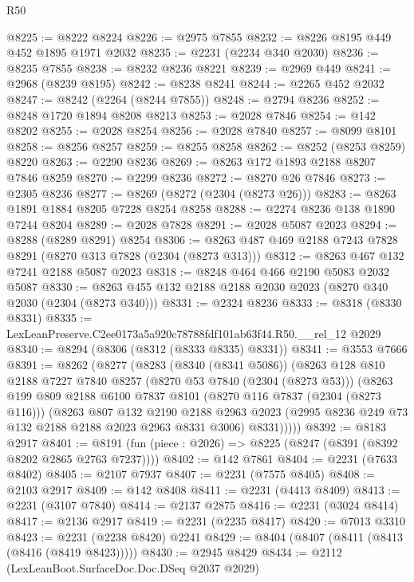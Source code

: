 \begin{lexlean}{R50}
\begin{coremodule}
@8225 := @8222 @8224
@8226 := @2975 @7855
@8232 := @8226 @8195 @449 @452 @1895 @1971 @2032
@8235 := @2231 (@2234 @340 @2030)
@8236 := @8235 @7855
@8238 := @8232 @8236 @8221
@8239 := @2969 @449
@8241 := @2968 (@8239 @8195)
@8242 := @8238 @8241
@8244 := @2265 @452 @2032
@8247 := @8242 (@2264 (@8244 @7855))
@8248 := @2794 @8236
@8252 := @8248 @1720 @1894 @8208 @8213
@8253 := @2028 @7846
@8254 := @142 @8202
@8255 := @2028 @8254
@8256 := @2028 @7840
@8257 := @8099 @8101
@8258 := @8256 @8257
@8259 := @8255 @8258
@8262 := @8252 (@8253 @8259) @8220
@8263 := @2290 @8236
@8269 := @8263 @172 @1893 @2188 @8207 @7846 @8259
@8270 := @2299 @8236
@8272 := @8270 @26 @7846
@8273 := @2305 @8236
@8277 := @8269 (@8272 (@2304 (@8273 @26)))
@8283 := @8263 @1891 @1884 @8205 @7228 @8254 @8258
@8288 := @2274 @8236 @138 @1890 @7244 @8204
@8289 := @2028 @7828
@8291 := @2028 @5087 @2023
@8294 := @8288 (@8289 @8291) @8254
@8306 := @8263 @487 @469 @2188 @7243 @7828 @8291 (@8270 @313 @7828 (@2304 (@8273 @313)))
@8312 := @8263 @467 @132 @7241 @2188 @5087 @2023
@8318 := @8248 @464 @466 @2190 @5083 @2032 @5087
@8330 := @8263 @455 @132 @2188 @2188 @2030 @2023 (@8270 @340 @2030 (@2304 (@8273 @340)))
@8331 := @2324 @8236
@8333 := @8318 (@8330 @8331)
@8335 := LexLeanPreserve.C2ee0173a5a920c78788fdf101ab63f44.R50.__rel_12 @2029
@8340 := @8294 (@8306 (@8312 (@8333 @8335) @8331))
@8341 := @3553 @7666
@8391 := @8262
    (@8277
      (@8283
        (@8340 (@8341 @5086))
        (@8263
          @128
          @810
          @2188
          @7227
          @7840
          @8257
          (@8270 @53 @7840 (@2304 (@8273 @53)))
          (@8263
            @199
            @809
            @2188
            @6100
            @7837
            @8101
            (@8270 @116 @7837 (@2304 (@8273 @116)))
            (@8263
              @807
              @132
              @2190
              @2188
              @2963
              @2023
              (@2995 @8236 @249 @73 @132 @2188 @2188 @2023 @2963 @8331 @3006)
              @8331)))))
@8392 := @8183 @2917
@8401 := @8191 (fun (piece : @2026) => @8225 (@8247 (@8391 (@8392 @8202 @2865 @2763 @7237))))
@8402 := @142 @7861
@8404 := @2231 (@7633 @8402)
@8405 := @2107 @7937
@8407 := @2231 (@7575 @8405)
@8408 := @2103 @2917
@8409 := @142 @8408
@8411 := @2231 (@4413 @8409)
@8413 := @2231 (@3107 @7840)
@8414 := @2137 @2875
@8416 := @2231 (@3024 @8414)
@8417 := @2136 @2917
@8419 := @2231 (@2235 @8417)
@8420 := @7013 @3310
@8423 := @2231 (@2238 @8420) @2241
@8429 := @8404 (@8407 (@8411 (@8413 (@8416 (@8419 @8423)))))
@8430 := @2945 @8429
@8434 := @2112 (LexLeanBoot.SurfaceDoc.Doc.DSeq @2037 @2029)

\end{coremodule}
\end{lexlean}
